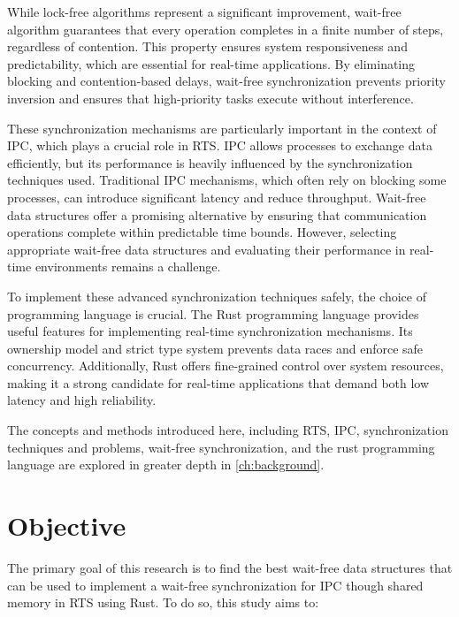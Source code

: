 While lock-free algorithms represent a significant improvement, wait-free algorithm guarantees that every operation completes in a finite number of steps, regardless of contention. This property ensures system responsiveness and predictability, which are essential for real-time applications. By eliminating blocking and contention-based delays, wait-free synchronization prevents priority inversion and ensures that high-priority tasks execute without interference. \cite{kogan2012methodology, herlihy1991wait, brandenburg2019multiprocessorrealtimelockingprotocols}

These synchronization mechanisms are particularly important in the context of \ac{IPC}, which plays a crucial role in \ac{RTS}. \ac{IPC} allows processes to exchange data efficiently, but its performance is heavily influenced by the synchronization techniques used. Traditional \ac{IPC} mechanisms, which often rely on blocking some processes, can introduce significant latency and reduce throughput. Wait-free data structures offer a promising alternative by ensuring that communication operations complete within predictable time bounds. However, selecting appropriate wait-free data structures and evaluating their performance in real-time environments remains a challenge. \cite{timnat2014practical, michael1996simple, huang2002improvingWaitFree, pellegrini2020relevancewaitfreecoordinationalgorithms}

To implement these advanced synchronization techniques safely, the choice of programming language is crucial. The Rust programming language provides useful features for implementing real-time synchronization mechanisms. Its ownership model and strict type system prevents data races and enforce safe concurrency. Additionally, Rust offers fine-grained control over system resources, making it a strong candidate for real-time applications that demand both low latency and high reliability. \cite{xu2023rust, sharma2024rustembeddedsystemscurrent}

The concepts and methods introduced here, including \ac{RTS}, \ac{IPC}, synchronization techniques and problems, wait-free synchronization, and the rust programming language are explored in greater depth in \cref{ch:background}. 

\section{Objective}\label{sec:objective}

The primary goal of this research is to find the best wait-free data structures that can be used to implement a wait-free synchronization for \ac{IPC} though shared memory in \ac{RTS} using Rust. To do so, this study aims to:

